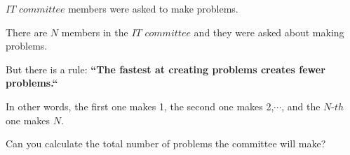 $IT$ $committee$ members were asked to make problems.

There are $N$ members in the $IT$ $committee$ and they were asked about making problems.

But there is a rule: \bf{``The fastest at creating problems creates fewer problems.``}

In other words,
the first one makes 1, the second one makes 2,$\cdots$, and the $N$-$th$ one makes $N$.

Can you calculate the total number of problems the committee will make?